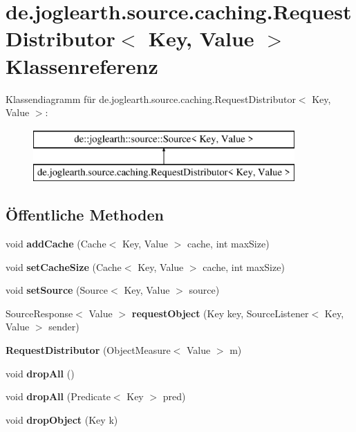 \section{de.\-joglearth.\-source.\-caching.\-Request\-Distributor$<$ Key, Value $>$ Klassenreferenz}
\label{classde_1_1joglearth_1_1source_1_1caching_1_1_request_distributor_3_01_key_00_01_value_01_4}
Klassendiagramm für de.\-joglearth.\-source.\-caching.\-Request\-Distributor$<$ Key, Value $>$\-:\begin{figure}[H]
\begin{center}
\leavevmode
\includegraphics[height=2.000000cm]{classde_1_1joglearth_1_1source_1_1caching_1_1_request_distributor_3_01_key_00_01_value_01_4}
\end{center}
\end{figure}
\subsection*{Öffentliche Methoden}
\begin{DoxyCompactItemize}
\item 
void {\bf add\-Cache} (Cache$<$ Key, Value $>$ cache, int max\-Size)
\item 
void {\bfseries set\-Cache\-Size} (Cache$<$ Key, Value $>$ cache, int max\-Size)\label{classde_1_1joglearth_1_1source_1_1caching_1_1_request_distributor_3_01_key_00_01_value_01_4_a9f434cffad6e2b3f6f085a3c42568e91}

\item 
void {\bf set\-Source} (Source$<$ Key, Value $>$ source)
\item 
Source\-Response$<$ Value $>$ {\bf request\-Object} (Key key, Source\-Listener$<$ Key, Value $>$ sender)
\item 
{\bf Request\-Distributor} (Object\-Measure$<$ Value $>$ m)
\item 
void {\bfseries drop\-All} ()\label{classde_1_1joglearth_1_1source_1_1caching_1_1_request_distributor_3_01_key_00_01_value_01_4_abf8c409b311e0888dd36dbca3c3dd6ae}

\item 
void {\bfseries drop\-All} (Predicate$<$ Key $>$ pred)\label{classde_1_1joglearth_1_1source_1_1caching_1_1_request_distributor_3_01_key_00_01_value_01_4_a9f5c4e8442dad9a5c1f2a9de21fcc13f}

\item 
void {\bfseries drop\-Object} (Key k)\label{classde_1_1joglearth_1_1source_1_1caching_1_1_request_distributor_3_01_key_00_01_value_01_4_a5e40a92cd0440bb2d6ab372e4c718cf4}

\end{DoxyCompactItemize}


